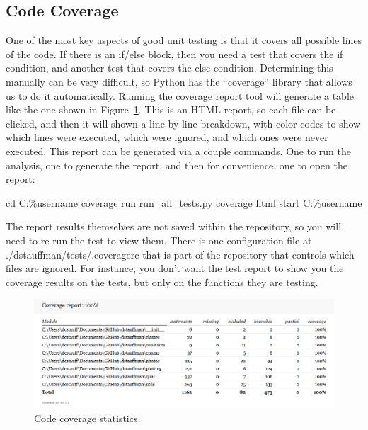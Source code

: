 \documentclass[12pt]{article}
\begin{document}
\subsection{Code Coverage}\label{h2:Code_coverage}
One of the most key aspects of good unit testing is that it covers all possible lines of the code.  If there is an if/else block, then you need a test that covers the if condition, and another test that covers the else condition.  Determining this manually can be very difficult, so Python has the ``coverage`` library that allows us to do it automatically.  Running the coverage report tool will generate a table like the one shown in Figure~\ref{fig:code_coverage}.  This is an HTML report, so each file can be clicked, and then it will shown a line by line breakdown, with color codes to show which lines were executed, which were ignored, and which ones were never executed.  This report can be generated via a couple commands.  One to run the analysis, one to generate the report, and then for convenience, one to open the report:
\begin{PlainText}
cd C:\Users\%username%
coverage run run_all_tests.py
coverage html
start C:\Users\%username%
\end{PlainText}

The report results themselves are not saved within the repository, so you will need to re-run the test to view them.  There is one configuration file at ./dstauffman/tests/.coveragerc that is part of the repository that controls which files are ignored.  For instance, you don't want the test report to show you the coverage results on the tests, but only on the functions they are testing.

\begin{figure}[H]
    \centering
    \includegraphics[width=\textwidth]{Coverage.png}
    \caption{Code coverage statistics.}
    \label{fig:code_coverage}
\end{figure}
\end{document}
